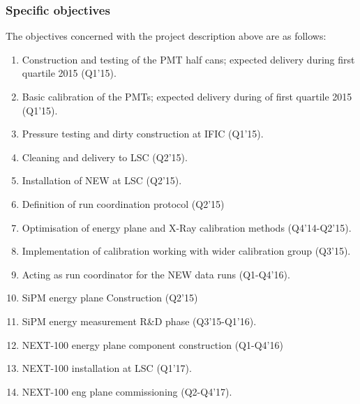 \documentclass[a4paper,11pt,oneside]{article}
\begin{document}
\subsubsection*{Specific objectives}
The objectives concerned with the project description above are as
follows:
\begin{enumerate}
  \item Construction and testing of the PMT half cans; expected
    delivery during first quartile 2015 (Q1'15).
  \item Basic calibration of the PMTs; expected
    delivery during of first quartile 2015 (Q1'15).
  \item Pressure testing and dirty construction at IFIC (Q1'15).
  \item Cleaning and delivery to LSC (Q2'15).
  \item Installation of NEW at LSC (Q2'15).
  \item Definition of run coordination protocol (Q2'15)
  \item Optimisation of energy plane and X-Ray calibration methods
    (Q4'14-Q2'15).
  \item Implementation of calibration working with wider calibration
    group (Q3'15).
  \item Acting as run coordinator for the NEW data runs (Q1-Q4'16).
  \item SiPM energy plane Construction (Q2'15)
  \item SiPM energy measurement R\&D phase (Q3'15-Q1'16).
  \item NEXT-100 energy plane component construction (Q1-Q4'16)
  \item NEXT-100 installation at LSC (Q1'17).
  \item NEXT-100 eng plane commissioning (Q2-Q4'17).
\end{enumerate}
\end{document}
